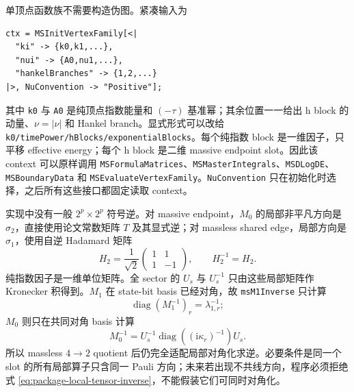 \documentclass[11pt,a4paper]{ctexart}
\newcommand{\ii}{\mathrm i}
\begin{document}
单顶点函数族不需要构造伪图。紧凑输入为
\begin{verbatim}
ctx = MSInitVertexFamily[<|
  "ki" -> {k0,k1,...},
  "nui" -> {A0,nu1,...},
  "hankelBranches" -> {1,2,...}
|>, NuConvention -> "Positive"];
\end{verbatim}
其中 \texttt{k0} 与 \texttt{A0} 是纯顶点指数能量和 $(-\tau)$ 基准幂；其余位置一一给出 h block 的动量、$\nu=|\nu|$ 和 Hankel branch。显式形式可以改给 \texttt{k0/timePower/hBlocks/exponentialBlocks}。每个纯指数 block 是一维因子，只平移 effective energy；每个 h block 是二维 massive endpoint slot。因此该 context 可以原样调用 \texttt{MSFormulaMatrices}、\texttt{MSMasterIntegrals}、\texttt{MSDLogDE}、\texttt{MSBoundaryData} 和 \texttt{MSEvaluateVertexFamily}。\texttt{NuConvention} 只在初始化时选择，之后所有这些接口都固定读取 context。

实现中没有一般 $2^p\times2^p$ 符号逆。对 massive endpoint，$M_0$ 的局部非平凡方向是 $\sigma_2$，直接使用论文常数矩阵 $T$ 及其显式逆；对 massless shared edge，局部方向是 $\sigma_1$，使用自逆 Hadamard 矩阵
\begin{equation}
 H_2=\frac1{\sqrt2}
 \begin{pmatrix}1&1\\1&-1\end{pmatrix},
 \qquad H_2^{-1}=H_2.
 \label{eq:package-hadamard-inverse}
\end{equation}
纯指数因子是一维单位矩阵。全 sector 的 $U_s$ 与 $U_s^{-1}$ 只由这些局部矩阵作 Kronecker 积得到。$M_1$ 在 state-bit basis 已经对角，故 \texttt{msM1Inverse} 只计算
\begin{equation}
 \operatorname{diag}(M_1^{-1})_r=\lambda_{1,r}^{-1};
\end{equation}
$M_0$ 则只在共同对角 basis 计算
\begin{equation}
 M_0^{-1}=U_s^{-1}\operatorname{diag}
 \left((\ii\kappa_r)^{-1}\right)U_s.
 \label{eq:package-local-tensor-inverse}
\end{equation}
所以 massless $4\to2$ quotient 后仍完全适配局部对角化求逆。必要条件是同一个 slot 的所有局部算子只含同一 Pauli 方向；未来若出现不共线方向，程序必须拒绝式 \eqref{eq:package-local-tensor-inverse}，不能假装它们可同时对角化。
\end{document}
